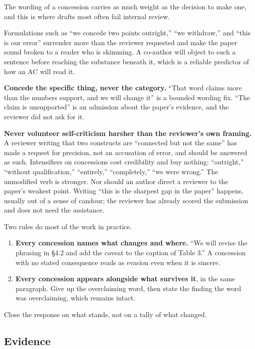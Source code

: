 The wording of a concession carries as much weight as the decision to make one, and this is where drafts most often fail internal review.

Formulations such as ``we concede two points outright,'' ``we withdraw,'' and ``this is our error'' surrender more than the reviewer requested and make the paper sound broken to a reader who is skimming.
A co-author will object to such a sentence before reaching the substance beneath it, which is a reliable predictor of how an AC will read it.

\textbf{Concede the specific thing, never the category.}
``That word claims more than the numbers support, and we will change it'' is a bounded wording fix.
``The claim is unsupported'' is an admission about the paper's evidence, and the reviewer did not ask for it.

\textbf{Never volunteer self-criticism harsher than the reviewer's own framing.}
A reviewer writing that two constructs are ``connected but not the same'' has made a request for precision, not an accusation of error, and should be answered as such.
Intensifiers on concessions cost credibility and buy nothing: ``outright,'' ``without qualification,'' ``entirely,'' ``completely,'' ``we were wrong.''
The unmodified verb is stronger.
Nor should an author direct a reviewer to the paper's weakest point.
Writing ``this is the sharpest gap in the paper'' happens, usually out of a sense of candour; the reviewer has already scored the submission and does not need the assistance.

Two rules do most of the work in practice.
\begin{enumerate}
    \item \textbf{Every concession names what changes and where.}
    ``We will revise the phrasing in \S4.2 and add the caveat to the caption of Table 3.''
    A concession with no stated consequence reads as evasion even when it is sincere.
    \item \textbf{Every concession appears alongside what survives it}, in the same paragraph.
    Give up the overclaiming word, then state the finding the word was overclaiming, which remains intact.
\end{enumerate}

Close the response on what stands, not on a tally of what changed.

\subsection*{Evidence}

